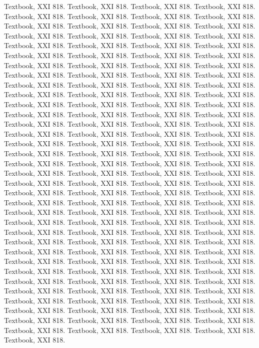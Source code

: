 \documentclass[11pt]{article}
\begin{document}
Textbook, XXI 818.
Textbook, XXI 818.
Textbook, XXI 818.
Textbook, XXI 818.
Textbook, XXI 818.
Textbook, XXI 818.
Textbook, XXI 818.
Textbook, XXI 818.
Textbook, XXI 818.
Textbook, XXI 818.
Textbook, XXI 818.
Textbook, XXI 818.
Textbook, XXI 818.
Textbook, XXI 818.
Textbook, XXI 818.
Textbook, XXI 818.
Textbook, XXI 818.
Textbook, XXI 818.
Textbook, XXI 818.
Textbook, XXI 818.
Textbook, XXI 818.
Textbook, XXI 818.
Textbook, XXI 818.
Textbook, XXI 818.
Textbook, XXI 818.
Textbook, XXI 818.
Textbook, XXI 818.
Textbook, XXI 818.
Textbook, XXI 818.
Textbook, XXI 818.
Textbook, XXI 818.
Textbook, XXI 818.
Textbook, XXI 818.
Textbook, XXI 818.
Textbook, XXI 818.
Textbook, XXI 818.
Textbook, XXI 818.
Textbook, XXI 818.
Textbook, XXI 818.
Textbook, XXI 818.
Textbook, XXI 818.
Textbook, XXI 818.
Textbook, XXI 818.
Textbook, XXI 818.
Textbook, XXI 818.
Textbook, XXI 818.
Textbook, XXI 818.
Textbook, XXI 818.
Textbook, XXI 818.
Textbook, XXI 818.
Textbook, XXI 818.
Textbook, XXI 818.
Textbook, XXI 818.
Textbook, XXI 818.
Textbook, XXI 818.
Textbook, XXI 818.
Textbook, XXI 818.
Textbook, XXI 818.
Textbook, XXI 818.
Textbook, XXI 818.
Textbook, XXI 818.
Textbook, XXI 818.
Textbook, XXI 818.
Textbook, XXI 818.
Textbook, XXI 818.
Textbook, XXI 818.
Textbook, XXI 818.
Textbook, XXI 818.
Textbook, XXI 818.
Textbook, XXI 818.
Textbook, XXI 818.
Textbook, XXI 818.
Textbook, XXI 818.
Textbook, XXI 818.
Textbook, XXI 818.
Textbook, XXI 818.
Textbook, XXI 818.
Textbook, XXI 818.
Textbook, XXI 818.
Textbook, XXI 818.
Textbook, XXI 818.
Textbook, XXI 818.
Textbook, XXI 818.
Textbook, XXI 818.
Textbook, XXI 818.
Textbook, XXI 818.
Textbook, XXI 818.
Textbook, XXI 818.
Textbook, XXI 818.
Textbook, XXI 818.
Textbook, XXI 818.
Textbook, XXI 818.
Textbook, XXI 818.
Textbook, XXI 818.
Textbook, XXI 818.
Textbook, XXI 818.
Textbook, XXI 818.
Textbook, XXI 818.
Textbook, XXI 818.
Textbook, XXI 818.
Textbook, XXI 818.
Textbook, XXI 818.
Textbook, XXI 818.
Textbook, XXI 818.
Textbook, XXI 818.
Textbook, XXI 818.
Textbook, XXI 818.
Textbook, XXI 818.
Textbook, XXI 818.
Textbook, XXI 818.
Textbook, XXI 818.
Textbook, XXI 818.
Textbook, XXI 818.
Textbook, XXI 818.
Textbook, XXI 818.
Textbook, XXI 818.
Textbook, XXI 818.
Textbook, XXI 818.
Textbook, XXI 818.
Textbook, XXI 818.
Textbook, XXI 818.
Textbook, XXI 818.
Textbook, XXI 818.
Textbook, XXI 818.
Textbook, XXI 818.
Textbook, XXI 818.
Textbook, XXI 818.
Textbook, XXI 818.
Textbook, XXI 818.
Textbook, XXI 818.
Textbook, XXI 818.
Textbook, XXI 818.
Textbook, XXI 818.
Textbook, XXI 818.
Textbook, XXI 818.
Textbook, XXI 818.
Textbook, XXI 818.
\end{document}
